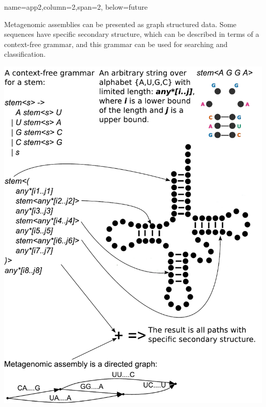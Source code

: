 \documentclass[a0paper,portrait]{baposter}
\begin{document}
\begin{poster}
{name=app2,column=2,span=2, below=future}
{
Metagenomic assemblies can be presented as graph structured data.
Some sequences have specific secondary structure, which can be described in terms of a context-free grammar, and this grammar can be used for searching and classification.

\begin{center}
\includegraphics[width=\textwidth]{secondaryStructure.pdf}
\end{center}
}




\end{poster}
\end{document}
